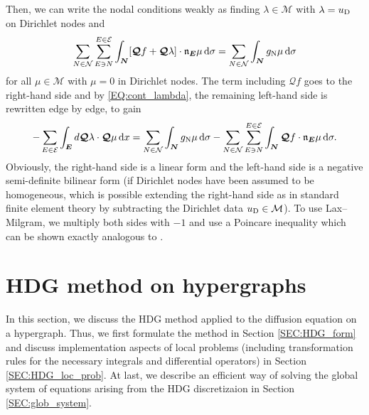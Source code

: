 \documentclass[a4paper, english, 12pt, reqno, draft]{amsart}
\theoremstyle{definition}
\theoremstyle{remark}
\numberwithin{equation}{section}
\newcommand{\setEdge}{\ensuremath{\mathcal E}}
\newcommand{\setNode}{\ensuremath{\mathcal N}}
\newcommand{\edge}{\ensuremath{E}}
\newcommand{\node}{\ensuremath{N}}
\newcommand{\Edge}{{\ensuremath{\boldsymbol E}}}
\newcommand{\Node}{{\ensuremath{\boldsymbol N}}}
\newcommand{\Normal}{\ensuremath{\mathfrak n_\Edge}}
\newcommand{\skeletalSpaceCont}{\ensuremath{\mathcal M}}
\renewcommand{\vec}[1]{\ensuremath{\boldsymbol{#1}}}
\newcommand{\dx}{\ensuremath{\, \textup d x}}
\newcommand{\ds}{\ensuremath{\, \textup d \sigma}}
\newcommand{\localQ}{\ensuremath{\vec{\mathcal Q}}}
\begin{document}
Then, we can write the nodal conditions weakly as finding $\lambda \in \skeletalSpaceCont$ with $\lambda = u_\text D$ on Dirichlet nodes and
% 
\begin{equation}
 \sum_{\node \in \setNode} \sum_{\edge \ni \node}^{\edge \in \setEdge} \int_\Node [\localQ f + \localQ \lambda] \cdot \Normal \mu \ds = \sum_{\node \in \setNode} \int_\Node g_\text N \mu \ds
\end{equation}
% 
for all $\mu \in \skeletalSpaceCont$ with $\mu = 0$ in Dirichlet nodes. The term including $\localQ f$ goes to the right-hand side and by \eqref{EQ:cont_lambda}, the remaining left-hand side is rewritten edge by edge, to gain
% 
\begin{equation}
 - \sum_{\edge \in \setEdge} \int_\Edge d \localQ \lambda \cdot \localQ \mu \dx = \sum_{\node \in \setNode} \int_\Node g_\text N \mu \ds - \sum_{\node \in \setNode} \sum_{\edge \ni \node}^{\edge \in \setEdge} \int_\Node \localQ f \cdot \Normal \mu \ds.
\end{equation}
% 
Obviously, the right-hand side is a linear form and the left-hand side is a negative semi-definite bilinear form (if Dirichlet nodes have been assumed to be homogeneous, which is possible extending the right-hand side as in standard finite element theory by subtracting the Dirichlet data $u_\textup D \in \skeletalSpaceCont$). To use Lax--Milgram, we multiply both sides with $-1$ and use a Poincare inequality which can be shown exactly analogous to \cite[Satz 6.21]{Dobrowolski2010}.
% 
\section{HDG method on hypergraphs}\label{SEC:hdg_graph}
%
In this section, we discuss the HDG method applied to the diffusion equation on a hypergraph. Thus, we first formulate the method in Section \ref{SEC:HDG_form} and discuss implementation aspects of local problems (including transformation rules for the necessary integrals and differential operators) in Section \ref{SEC:HDG_loc_prob}. At last, we describe an efficient way of solving the global system of equations arising from the HDG discretizaion in Section \ref{SEC:glob_system}.
% 
\end{document}
